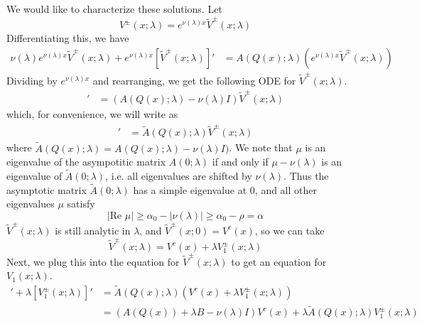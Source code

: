 \documentclass[thesis.tex]{subfiles}
\begin{document}
We would like to characterize these solutions. Let
\[
V^\pm(x; \lambda) = e^{\nu(\lambda)x}\tilde{V}^\pm(x; \lambda)
\]
Differentiating this, we have
\begin{align*}
\nu(\lambda) e^{\nu(\lambda)x}\tilde{V}^\pm(x; \lambda) 
+ e^{\nu(\lambda)x}[\tilde{V}^\pm(x; \lambda)]'
&= A(Q(x); \lambda) (e^{\nu(\lambda)x}\tilde{V}^\pm(x; \lambda))
\end{align*}
Dividing by $e^{\nu(\lambda)x}$ and rearranging, we get the following ODE for $\tilde{V}^\pm(x; \lambda)$.
\begin{align*}
[\tilde{V}^\pm(x; \lambda)]'
&= (A(Q(x); \lambda) - \nu(\lambda)I)\tilde{V}^\pm(x; \lambda)
\end{align*}
which, for convenience, we will write as
\begin{align*}
[\tilde{V}^\pm(x; \lambda)]'
&= \tilde{A}(Q(x); \lambda)\tilde{V}^\pm(x; \lambda)
\end{align*}
where $\tilde{A}(Q(x); \lambda) = A(Q(x); \lambda) - \nu(\lambda)I)$. We note that $\mu$ is an eigenvalue of the asympotitic matrix $A(0; \lambda)$ if and only if $\mu - \nu(\lambda)$ is an eigenvalue of $\tilde{A}(0; \lambda)$, i.e. all eigenvalues are shifted by $\nu(\lambda)$. Thus the asymptotic matrix $\tilde{A}(0; \lambda)$ has a simple eigenvalue at 0, and all other eigenvalues $\mu$ satisfy
\[
|\text{Re }\mu| \geq \alpha_0 - |\nu(\lambda)| \geq \alpha_0 - \rho = \alpha
\]
$\tilde{V}^\pm(x; \lambda)$ is still analytic in $\lambda$, and $\tilde{V}^\pm(x; 0) = V^c(x)$, so we can take 
\[
\tilde{V}^\pm(x; \lambda) = V^c(x) + \lambda V_1^\pm(x; \lambda)
\]
Next, we plug this into the equation for $\tilde{V}^\pm(x; \lambda)$ to get an equation for $V_1(x; \lambda)$.
\begin{align*}
[V^c(x)]' + \lambda [V_1^\pm(x; \lambda)]'
&= \tilde{A}(Q(x); \lambda)(V^c(x) + \lambda V_1^\pm(x; \lambda)) \\
&= (A(Q(x)) + \lambda B - \nu(\lambda)I)V^c(x) + \lambda \tilde{A}(Q(x); \lambda) V_1^\pm(x; \lambda) \\

\end{align*}
\end{document}

